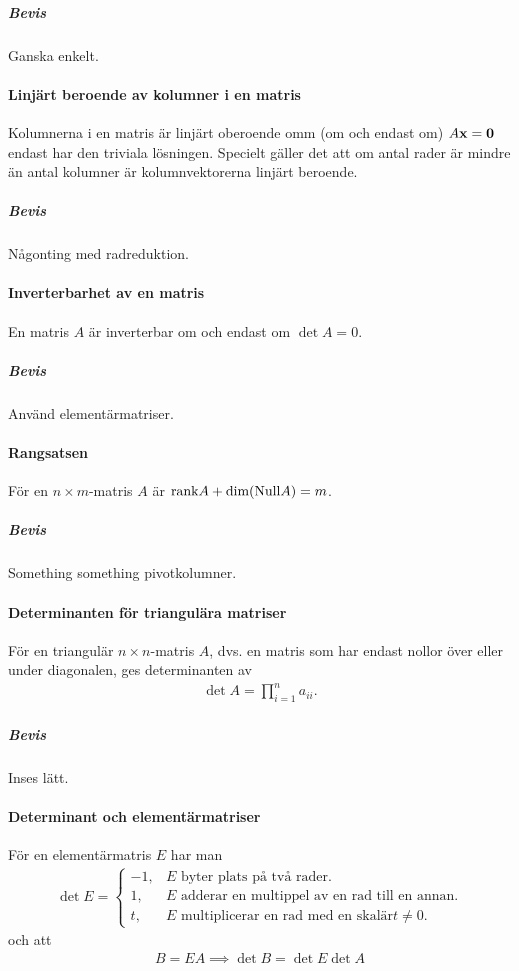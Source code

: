 \subparagraph{Bevis}
Ganska enkelt.

\paragraph{Linjärt beroende av kolumner i en matris}
Kolumnerna i en matris är linjärt oberoende omm (om och endast om) $A\vect{x} = \vect{0}$ endast har den triviala lösningen. Specielt gäller det att om antal rader är mindre än antal kolumner är kolumnvektorerna linjärt beroende.

\subparagraph{Bevis}
Någonting med radreduktion.

\paragraph{Inverterbarhet av en matris}
En matris $A$ är inverterbar om och endast om $\det A = 0$.

\subparagraph{Bevis}
Använd elementärmatriser.

\paragraph{Rangsatsen}
För en $n\times m$-matris $A$ är $\text{rank} A + \text{dim}(\text{Null} A) = m$.

\subparagraph{Bevis}
Something something pivotkolumner.

\paragraph{Determinanten för triangulära matriser}
För en triangulär $n\times n$-matris $A$, dvs. en matris som har endast nollor över eller under diagonalen, ges determinanten av
\begin{align*}
	\det{A} = \prod\limits_{i = 1}^{n} a_{ii}.
\end{align*}

\subparagraph{Bevis}
Inses lätt.

\paragraph{Determinant och elementärmatriser}
För en elementärmatris $E$ har man
\begin{align*}
	\det{E} =
	\begin{cases}
		-1, &E\text{ byter plats på två rader.} \\
		1,  &E\text{ adderar en multippel av en rad till en annan.} \\
		t,  &E\text{ multiplicerar en rad med en skalär} t\neq 0.
	\end{cases}
\end{align*}
och att
\begin{align*}
	B = EA \implies \det{B} = \det{E}\det{A}
\end{align*}

